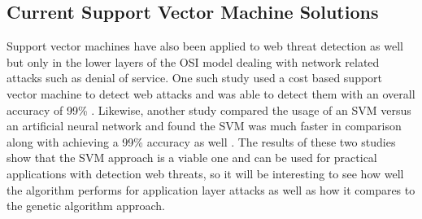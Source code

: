 \subsection{Current Support Vector Machine Solutions} \label{sec:SVMSolutions}

Support vector machines have also been applied to web threat detection as well but only in the lower layers of the OSI model dealing with network related attacks such as denial of service.  One such study used a cost based support vector machine to detect web attacks and was able to detect them with an overall accuracy of 99\% \cite{intrusionDetectionCostBased}.  Likewise, another study compared the usage of an SVM versus an artificial neural network and found the SVM was much faster in comparison along with achieving a 99\% accuracy as well \cite{intrusionDetectionNeural}.  The results of these two studies show that the SVM approach is a viable one and can be used for practical applications with detection web threats, so it will be interesting to see how well the algorithm performs for application layer attacks as well as how it compares to the genetic algorithm approach.


